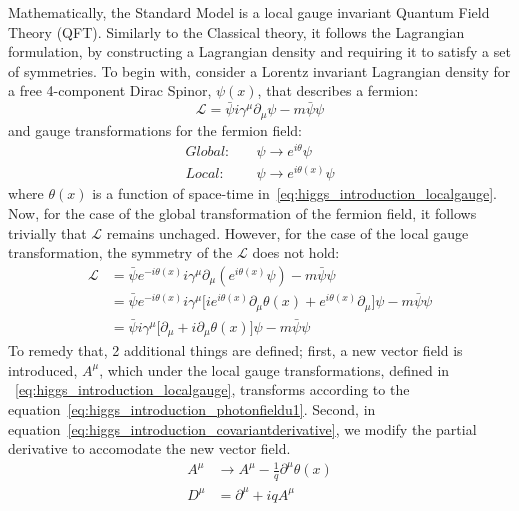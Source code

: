 Mathematically, the Standard Model is a local gauge invariant Quantum Field Theory (QFT). Similarly to the Classical theory, it follows the Lagrangian formulation, by constructing a Lagrangian density and requiring it to satisfy a set of symmetries. To begin with, consider a Lorentz invariant Lagrangian density for a free 4-component Dirac Spinor, $\psi(x)$, that describes a fermion:
\begin{equation}
    \label{eq:higgs_introduction_diracLagrangian}
    \mathcal{L} = \bar{\psi}i\gamma^{\mu}\partial_{\mu}\psi - m\bar{\psi}\psi
\end{equation}
and gauge transformations for the fermion field:
\begin{subequations}\label{grp}
\begin{align}
    Global:&\quad \psi \rightarrow e^{i\theta}\psi\\
    Local:&\quad \psi \rightarrow e^{i\theta(x)}\psi\label{eq:higgs_introduction_localgauge}
\end{align}
\end{subequations}
where $\theta(x)$ is a function of space-time in~\ref{eq:higgs_introduction_localgauge}. Now, for the case of the global transformation of the fermion field, it follows trivially that $\mathcal{L}$ remains unchaged. However, for the case of the local gauge transformation, the symmetry of the $\mathcal{L}$ does not hold:
\begin{equation}\label{eq:higgs_introduction_diraclocalgauge}
    \begin{split}
    \mathcal{L}& = \bar{\psi}e^{-i\theta(x)}i\gamma^{\mu}\partial_{\mu}(e^{i\theta(x)}\psi) - m\bar{\psi}\psi\\
    & = \bar{\psi}e^{-i\theta(x)}i\gamma^{\mu} \lbrack ie^{i\theta(x)}\partial_{\mu}\theta(x) + e^{i\theta(x)}\partial_{\mu} \rbrack \psi - m\bar{\psi}\psi\\
    & = \bar{\psi}i\gamma^{\mu} \lbrack \partial_{\mu} + i\partial_{\mu}\theta(x) \rbrack \psi - m\bar{\psi}\psi
    \end{split}
\end{equation}
To remedy that, 2 additional things are defined; first, a new vector field is introduced, $A^{\mu}$, which under the local gauge transformations, defined in ~\ref{eq:higgs_introduction_localgauge}, transforms according to the equation~\ref{eq:higgs_introduction_photonfieldu1}. Second, in equation~\ref{eq:higgs_introduction_covariantderivative}, we modify the partial derivative to accomodate the new vector field.
\begin{subequations}\label{eq:higgs_introduction_qedgauge}
\begin{align}
    A^{\mu}& \rightarrow A^{\mu} - \frac{1}{q}\partial^{\mu}\theta(x)\label{eq:higgs_introduction_photonfieldu1}\\
    D^{\mu}& = \partial^{\mu} + iqA^{\mu}\label{eq:higgs_introduction_covariantderivative}
\end{align}
\end{subequations}
